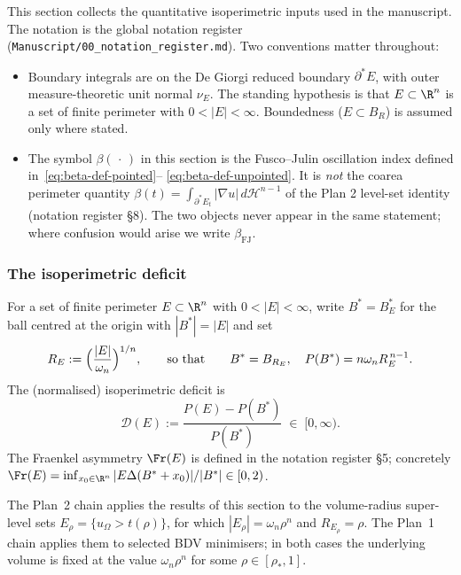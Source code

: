 This section collects the quantitative isoperimetric inputs used in the
manuscript. The notation is the global notation register
(\texttt{Manuscript/00\_notation\_register.md}). Two conventions matter
throughout:
\begin{itemize}
\item Boundary integrals are on the De Giorgi reduced boundary
      $\partial^* E$, with outer measure-theoretic unit normal $\nu_E$.
      The standing hypothesis is that $E\subset\R^n$ is a set of finite
      perimeter with $0<|E|<\infty$. Boundedness ($E\subset B_R$) is
      assumed only where stated.
\item The symbol $\beta(\,\cdot\,)$ in this section is the Fusco--Julin
      oscillation index defined in~\eqref{eq:beta-def-pointed}--%
      \eqref{eq:beta-def-unpointed}. It is \emph{not} the coarea
      perimeter quantity $\beta(t)=\int_{\partial^*E_t}|\nabla u|\,
      d\mathcal H^{n-1}$ of the Plan 2 level-set
      identity (notation register \S8). The two objects never appear in
      the same statement; where confusion would arise we write
      $\beta_{\mathrm{FJ}}$.
\end{itemize}

\subsubsection{The isoperimetric deficit}\label{ssec:iso-deficit}

For a set of finite perimeter $E\subset\R^n$ with $0<|E|<\infty$, write
$B^*=B^*_E$ for the ball centred at the origin with $|B^*|=|E|$ and set
\begin{equation}\label{eq:R-E-def}
   R_E:=\Bigl(\frac{|E|}{\omega_n}\Bigr)^{1/n},
   \qquad\text{so that}\qquad
   B^*=B_{R_E},\quad
   P(B^*)=n\omega_n R_E^{\,n-1}.
\end{equation}
The (normalised) isoperimetric deficit is
\begin{equation}\label{eq:def-D}
   \mathcal D(E):=\frac{P(E)-P(B^*)}{P(B^*)}\;\in\;[0,\infty).
\end{equation}
The Fraenkel asymmetry $\Fr(E)$ is defined in the notation
register \S5; concretely
$\Fr(E)=\inf_{x_0\in\R^n}|E\Delta(B^*+x_0)|/|B^*|\in[0,2)$.

\begin{remark}
The Plan~2 chain applies the results of this section to the volume-radius
super-level sets $E_\rho=\{u_\Omega>t(\rho)\}$, for which
$|E_\rho|=\omega_n\rho^n$ and $R_{E_\rho}=\rho$. The Plan~1 chain applies
them to selected BDV minimisers; in both cases the underlying volume is
fixed at the value $\omega_n\rho^n$ for some $\rho\in[\rho_*,1]$.
\end{remark}

